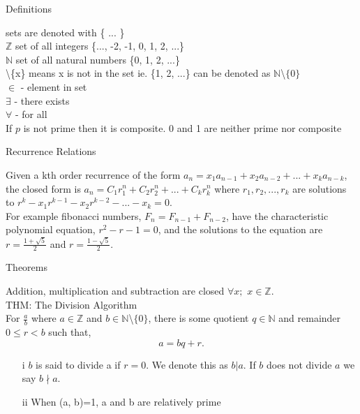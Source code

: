 \documentclass[12pt]{article}
\def \z{\mathbb{Z}}
\def \n{\mathbb{N}}
\def \no{\noindent}
\begin{document}
\begin{center} Definitions \end{center}

\no sets are denoted with \{ ... \}\\

\no $\z$ set of all integers \{..., -2, -1, 0, 1, 2, ...\}\\

\no $\n$ set of all natural numbers \{0, 1, 2, ...\}\\

\no \textbackslash \{x\} means x is not in the set ie. \{1, 2, ...\} can be denoted as $\n$\textbackslash$\{0\}$\\

\no $\in$ - element in set\\

\no $\exists$ - there exists\\

\no $\forall$ - for all\\

\no If $p$ is not prime then it is composite. 0 and 1 are neither prime nor composite\\

\no 

\no

\begin{center} Recurrence Relations \end{center}

Given a kth order recurrence of the form $a_n=x_1a_{n-1}+x_2a_{n-2}+...+x_ka_{n-k}$, the closed form is $a_n = C_1r_1^n+C_2r_2^n+...+C_kr_k^n$ where $r_1,r_2,...,r_k$ are solutions to $r^k-x_1r^{k-1}-x_2r^{k-2}-...-x_k=0$.\\

For example fibonacci numbers, $F_n = F_{n-1} + F_{n-2}$, have the characteristic polynomial equation, $r^2 -r -1 = 0$, and the solutions to the equation are $r=\frac{1+\sqrt{5}}2$ and $r=\frac{1-\sqrt{5}}2$.

\begin{center} Theorems \end{center}

\no Addition, multiplication and subtraction are closed $\forall x;$ $x \in \z$.\\

\no THM: The Division Algorithm\\
\hangindent=1cm For $\frac ab$ where $a \in \z$ and $b \in \n$\textbackslash$\{0\}$, there is some quotient $q \in \n$ and remainder $0 \leq r < b$ such that, \[ a = bq + r.\]
 \begin{itemize}
	\item[i] $b$ is said to divide a if $r=0$. We denote this as $b|a$. If $b$ does not divide $a$ we say $b \nmid a$.
	\item[ii] When (a, b)=1, a and b are relatively prime\\
\end{itemize}
\end{document}
